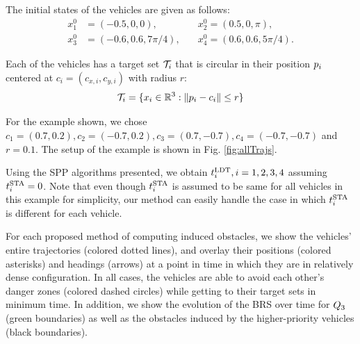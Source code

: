 The initial states of the vehicles are given as follows:
\begin{equation}
\begin{aligned}
x_1^0 &= (-0.5, 0, 0), \quad &x_2^0 = (0.5, 0, \pi), \\
x_3^0 &= \left(-0.6, 0.6, 7\pi/4\right), \quad &x_4^0 = \left(0.6, 0.6, 5\pi/4\right).
\end{aligned}
\end{equation}

\noindent Each of the vehicles has a target set $\mathcal{T}_i$ that is circular in their position $p_i$ centered at $c_i = (c_{x,i}, c_{y,i})$ with radius $r$:
\vspace{-0.2em}
\begin{equation}
\mathcal{T}_i = \{x_i \in \mathbb{R}^3: \|p_i - c_i\| \le r\}
\end{equation}

\noindent For the example shown, we chose $c_1 = (0.7, 0.2), c_2 = (-0.7, 0.2), c_3 = (0.7, -0.7), c_4 = (-0.7, -0.7)$ and $r = 0.1$. The setup of the example is shown in Fig. \ref{fig:allTrajs}.

Using the SPP algorithms presented, we obtain $t^\text{LDT}_i, i=1,2,3,4$ assuming $t^\text{STA}_i=0$. Note that even though $t^\text{STA}_i$ is assumed to be same for all vehicles in this example for simplicity, our method can easily handle the case in which $t^\text{STA}_i$ is different for each vehicle.

For each proposed method of computing induced obstacles, we show the vehicles' entire trajectories (colored dotted lines), and overlay their positions (colored asterisks) and headings (arrows) at a point in time in which they are in relatively dense configuration. In all cases, the vehicles are able to avoid each other's danger zones (colored dashed circles) while getting to their target sets in minimum time. In addition, we show the evolution of the BRS over time for $Q_3$ (green boundaries) as well as the obstacles induced by the higher-priority vehicles (black boundaries).

